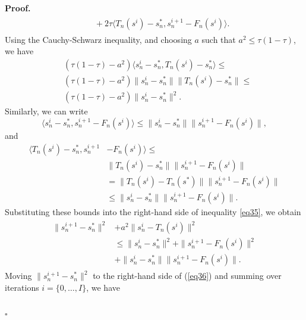 \documentclass[twocolumn]{autart}
\newenvironment{proof}[1][Proof]{%
  \par\noindent\textbf{#1.}\ }{%
  \hfill$\square$\par
}
\begin{document}
\begin{proof}
\begin{equation}
\begin{aligned}
\begin{split}
		&\quad+ 2\tau\langle T_n(s^i)-s_n^*, s_n^{i+1}-F_n(s^i)\rangle.
		\end{split}
		\end{aligned}
	\end{equation}
	Using the Cauchy-Schwarz inequality, and choosing $a$ such that $a^2\leq \tau(1-\tau)$, we have 
    \begin{equation*}
    \begin{aligned}
         &(\tau(1-\tau)-a^2)\langle s_n^i-s_n^*, T_n(s^i)-s_n^*\rangle\leq\\& (\tau(1-\tau)-a^2)\|s_n^i-s_n^*\|\|T_n(s^i)-s_n^*\|\leq \\&(\tau(1-\tau)-a^2)\|s_n^i-s_n^*\|^2.
    \end{aligned}
    \end{equation*}
    Similarly, we can write 
    \begin{equation*}\langle s_n^i-s_n^*, s_n^{i+1}-F_n(s^i)\rangle\leq \|s_n^i-s_n^*\|\|s_n^{i+1}-F_n(s^i)\|,\end{equation*} 
    and 
    \begin{equation*}
    \begin{aligned}
         \langle T_n(s^i)-s_n^*, s_n^{i+1}&-F_n(s^i)\rangle \leq \\&\|T_n(s^i)-s_n^*\|\|s_n^{i+1}-F_n(s^i)\|\\&=\|T_n(s^i)-T_n(s^*)\|\|s_n^{i+1}-F_n(s^i)\|\\&\leq \|s_n^i-s_n^*\|\|s_n^{i+1}-F_n(s^i)\|.
    \end{aligned}  
	\end{equation*} 
    Substituting these bounds into the right-hand side of inequality \eqref{eq35}, we obtain
	\begin{equation}\label{eq36}
	\begin{aligned}
		\begin{split}
		\|s_n^{i+1}-s_n^*\|^2&+a^2\|s_n^i-T_n(s^i)\|^2\\
		&\leq\|s_n^i-s_n^*\|^2+ \|s_n^{i+1}-F_n(s^i)\|^2\\
		& +\|s_n^i-s_n^*\|\|s_n^{i+1}-F_n(s^i)\|.
		\end{split}
	\end{aligned}
	\end{equation}
	Moving $\|s_n^{i+1}-s_n^*\|^2$ to the right-hand side of (\ref{eq36}) and summing over iterations $i=\{0,\ldots, I\}$, we have
	\begin{equation}\label{eq37}
		\begin{aligned}
			\begin{split}

\end{split}
\end{aligned}
\end{equation}
\end{proof}
\end{document}
